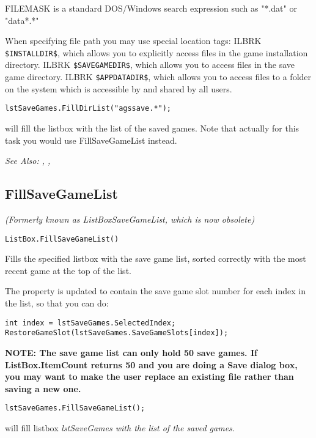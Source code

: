 FILEMASK is a standard DOS/Windows search expression such as "*.dat"
or "data*.*"

When specifying file path you may use special location tags: ILBRK
\verb^$INSTALLDIR$^, which allows you to explicitly access files in the game installation directory. ILBRK
\verb^$SAVEGAMEDIR$^, which allows you to access files in the save game directory. ILBRK
\verb^$APPDATADIR$^, which allows you to access files to a folder on the system which
is accessible by and shared by all users.

\begin{verbatim}
lstSaveGames.FillDirList("agssave.*");
\end{verbatim}
will fill the listbox with the list of the saved games. Note that actually for this
task you would use FillSaveGameList instead.

\it{See Also:} , ,


\subsection{FillSaveGameList}\label{ListBox.FillSaveGameList}%

\it{(Formerly known as ListBoxSaveGameList, which is now obsolete)}

\begin{verbatim}
ListBox.FillSaveGameList()
\end{verbatim}
Fills the specified listbox with the save game list, sorted correctly
with the most recent game at the top of the list.

The  property is updated to
contain the save game slot number for each index in the list, so that you can do:
\begin{verbatim}
int index = lstSaveGames.SelectedIndex;
RestoreGameSlot(lstSaveGames.SaveGameSlots[index]);
\end{verbatim}
\bf{NOTE:} The save game list can only hold 50 save games. If ListBox.ItemCount
returns 50 and you are doing a Save dialog box, you may want to make the
user replace an existing file rather than saving a new one.

\begin{verbatim}
lstSaveGames.FillSaveGameList();
\end{verbatim}
will fill listbox \it{lstSaveGames} with the list of the saved games.

